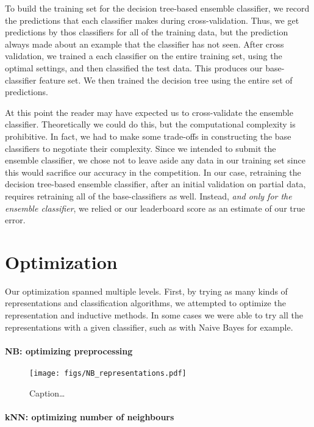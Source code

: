 \documentclass[conference,letterpaper]{IEEEtran}
\begin{document}
To build the training set for the decision tree-based ensemble classifier,
we record the predictions that each classifier makes during cross-validation.
Thus, we get predictions by thos classifiers for all of the training data,
but the prediction always made about an example that the classifier has 
not seen.  After cross validation, we trained a each classifier on the
entire training set, using the optimal settings, and then classified the test
data.  This produces our base-classifier feature set.  We then  
trained the decision tree using the entire set of predictions.

At this point the reader may have expected us to cross-validate the 
ensemble classifier.  Theoretically we could do this, but the computational
complexity is prohibitive.  In fact, we had to make some trade-offs in 
constructing the base classifiers to negotiate their complexity.  Since we
intended to submit the ensemble classifier, we chose not to leave aside any
data in our training set since this would sacrifice our accuracy in the
competition.  In our case, retraining the decision tree-based ensemble
classifier, after an initial validation on partial data, requires
retraining all of the base-classifiers as well.  Instead, 
\textit{and only for the ensemble classifier}, we relied or our leaderboard 
score as an estimate of our true error.

\section{Optimization}
Our optimization spanned multiple levels.  First, by trying as many kinds
of representations and classification algorithms, we attempted to optimize 
the representation and inductive methods.  In some cases we were able to try
all the representations with a given classifier, such as with Naive Bayes for 
example.

\paragraph{NB: optimizing preprocessing}
\begin{figure*}
	\centering
	\texttt{[image: figs/NB\_representations.pdf]}
	\caption{Caption\dots}
	\label{fig:NB_representations}
\end{figure*}


\paragraph{kNN: optimizing number of neighbours}
\end{document}
